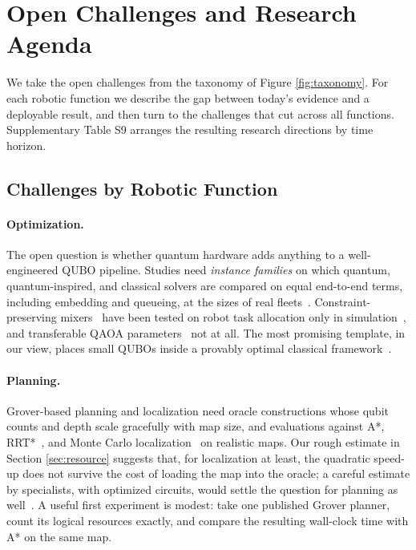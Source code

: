 \documentclass[acmsmall,screen,review]{acmart}
\begin{document}
\section{Open Challenges and Research Agenda}\label{sec:challenges}
We take the open challenges from the taxonomy of Figure \ref{fig:taxonomy}. For each robotic function we describe the gap between today's evidence and a deployable result, and then turn to the challenges that cut across all functions. Supplementary Table S9 arranges the resulting research directions by time horizon.


\subsection{Challenges by Robotic Function}\label{sec:ch-function}
\paragraph{Optimization.} The open question is whether quantum hardware adds anything to a well-engineered QUBO pipeline. Studies need \emph{instance families} on which quantum, quantum-inspired, and classical solvers are compared on equal end-to-end terms, including embedding and queueing, at the sizes of real fleets~\cite{Leib2023,Quang2025}. Constraint-preserving mixers~\cite{Hadfield2019} have been tested on robot task allocation only in simulation~\cite{Bang2026}, and transferable QAOA parameters~\cite{Zhou2020} not at all. The most promising template, in our view, places small QUBOs inside a provably optimal classical framework~\cite{Gerlach2025}.

\paragraph{Planning.} Grover-based planning and localization need oracle constructions whose qubit counts and depth scale gracefully with map size, and evaluations against A*, RRT*~\cite{Karaman2011}, and Monte Carlo localization~\cite{Dellaert1999} on realistic maps. Our rough estimate in Section \ref{sec:resource} suggests that, for localization at least, the quadratic speed-up does not survive the cost of loading the map into the oracle; a careful estimate by specialists, with optimized circuits, would settle the question for planning as well~\cite{Babbush2021}. A useful first experiment is modest: take one published Grover planner, count its logical resources exactly, and compare the resulting wall-clock time with A* on the same map.
\end{document}
